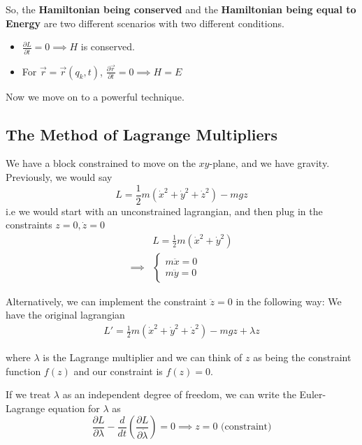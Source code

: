 \documentclass[11pt]{article}
\begin{document}
\vskip 0.25cm
So, the \textbf{Hamiltonian being conserved} and the \textbf{Hamiltonian being equal to Energy} are two different scenarios with two different conditions.

\begin{redbox}
  \begin{itemize}
    \item $\frac{\partial L}{\partial t} = 0 \implies H$ is conserved.
    \item For $\vec{r} = \vec{r}(q_k, t)$, $\frac{\partial \vec{r}}{\partial t} = 0 \implies H = E$
  \end{itemize}
\end{redbox}

\vskip 0.5cm
Now we move on to a powerful technique.

\vskip 1cm
\subsection{The Method of Lagrange Multipliers}

\vskip 0.5cm

\vskip 0.5cm
We have a block constrained to move on the $xy$-plane, and we have gravity. Previously, we would say 
\[ L = \frac{1}{2} m \left( \dot{x}^2 + \dot{y}^2 + \dot{z}^2\right) - mgz \] i.e we would start with an unconstrained lagrangian, and then plug in the constraints $z = 0, \dot{z} = 0$
\begin{align*}
  &L = \frac{1}{2}m(\dot{x}^2 + \dot{y}^2) \\
  \implies & \begin{cases}
    m \ddot{x} = 0 \\
    m \ddot{y} = 0
  \end{cases} 
\end{align*}

\vskip 0.5cm
Alternatively, we can implement the constraint $\ddot{z} = 0$ in the following way: We have the original lagrangian
\begin{align*}
  L' = \frac{1}{2} m \left( \dot{x}^2 + \dot{y}^2 + \dot{z}^2\right) - mgz + \lambda z
\end{align*}

where $\lambda$ is the Lagrange multiplier and we can think of $z$ as being the constraint function $f(z)$ and our constraint is $f(z) = 0$.

\vskip 0.5cm
If we treat $\lambda$ as an independent degree of freedom, we can write the Euler-Lagrange equation for $\lambda$ as 
\[ \frac{\partial L}{\partial \lambda} - \frac{d}{dt} \left(\frac{\partial L}{\partial \dot{\lambda}}\right) = 0 \implies z = 0 \text{ (constraint)} \]
\end{document}
